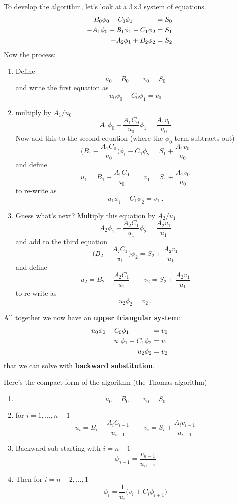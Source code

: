 \documentclass[12pt]{article}
\begin{document}
To develop the algorithm, let's look at a 3$\times$3 system of equations.
\begin{align}
B_0\phi_0 - C_0\phi_1 \hspace*{3.25em}&= S_0 \nonumber \\
-A_1\phi_0 + B_1\phi_1 - C_1\phi_2 &= S_1 \nonumber \\
-A_2\phi_1 + B_2\phi_2 &= S_2 \nonumber 
\end{align}
%
Now the process:
\begin{enumerate}
\item Define
\[u_0 = B_0 \qquad v_0 = S_0\]
and write the first equation as
\[u_0\phi_0 - C_0\phi_1 = v_0\]

\item multiply by $A_1 / u_0$
\[A_1\phi_0 - \frac{A_1 C_0}{u_0}\phi_1 = \frac{A_1 v_0}{u_0}\]
Now add this to the second equation (where the $\phi_0$ term subtracts out)
\[\biggl(B_1-\frac{A_1 C_0}{u_0}\biggr)\phi_1 - C_1\phi_2 = S_1 + \frac{A_1 v_0}{u_0}\]
%
and define
\[u_1 = B_1-\frac{A_1 C_0}{u_0} \qquad v_1 = S_1 + \frac{A_1 v_0}{u_0}\]
to re-write as
\[u_1\phi_1 - C_1\phi_2 = v_1\:.\]

\item Guess what's next? Multiply this equation by $A_2 / u_1$
\[A_2\phi_1 - \frac{A_2 C_1}{u_1}\phi_2 = \frac{A_2 v_1}{u_1}\]
and add to the third equation
\[\biggl(B_2-\frac{A_2 C_1}{u_1}\biggr)\phi_2 = S_2 + \frac{A_2 v_1}{u_1}\]
%
and define
\[u_2 = B_2-\frac{A_2 C_1}{u_1} \qquad v_2 = S_2 + \frac{A_2 v_1}{u_1}\]
to re-write as
\[u_2\phi_2 = v_2 \:.\]
\end{enumerate}
%
All together we now have an \textbf{upper triangular system}:
\begin{align}
u_0\phi_0 - C_0\phi_1 \hspace*{3.25em} &= v_0 \nonumber \\
u_1\phi_1 - C_1\phi_2 &= v_1 \nonumber \\
u_2\phi_2 &= v_2 \nonumber
\end{align}
%
that we can solve with \textbf{backward substitution}.

Here's the compact form of the algorithm (the Thomas algorithm)
\begin{enumerate}
\item \[u_0 = B_0 \qquad v_0 = S_0\]

\item for $i=1, \dots, n-1$
\[u_i = B_i-\frac{A_i C_{i-1}}{u_{i-1}} \qquad v_i = S_i + \frac{A_i v_{i-1}}{u_{i-1}}\]

\item Backward sub starting with $i=n-1$
\[\phi_{n-1} = \frac{v_{n-1}}{u_{n-1}}\]

\item Then for $i= n-2, \dots, 1$
\[\phi_i = \frac{1}{u_i}\bigl(v_i + C_i \phi_{i+1}\bigr)\]
\end{enumerate}
\end{document}
